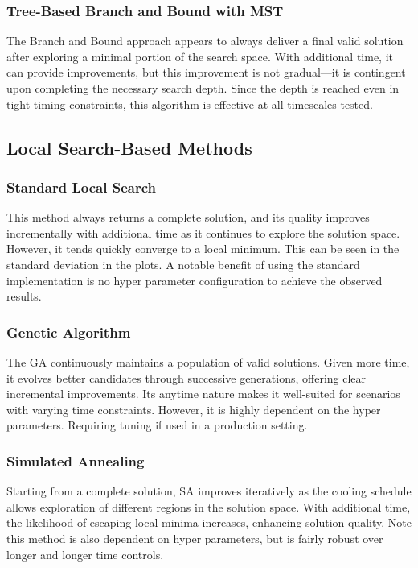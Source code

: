 \documentclass[11pt]{article}
\begin{document}
	\subsubsection{Tree-Based Branch and Bound with MST} 
	The Branch and Bound approach appears to always deliver a final valid solution after exploring a minimal portion of the search space. With additional time, it can provide improvements, but this improvement is not gradual—it is contingent upon completing the necessary search depth. Since the depth is reached even in tight timing constraints, this algorithm is effective at all timescales tested.
	
	\subsection{Local Search-Based Methods}
	\subsubsection{Standard Local Search}
	This method always returns a complete solution, and its quality improves incrementally with additional time as it continues to explore the solution space. However, it tends quickly converge to a local minimum. This can be seen in the standard deviation in the plots. A notable benefit of using the standard implementation is no hyper parameter configuration to achieve the observed results. 
	
	\subsubsection{Genetic Algorithm} 
	The GA continuously maintains a population of valid solutions. Given more time, it evolves better candidates through successive generations, offering clear incremental improvements. Its anytime nature makes it well-suited for scenarios with varying time constraints. However, it is highly dependent on the hyper parameters. Requiring tuning if used in a production setting.
	
	\subsubsection{Simulated Annealing} 
	Starting from a complete solution, SA improves iteratively as the cooling schedule allows exploration of different regions in the solution space. With additional time, the likelihood of escaping local minima increases, enhancing solution quality. Note this method is also dependent on hyper parameters, but is fairly robust over longer and longer time controls.
	
\end{document}
